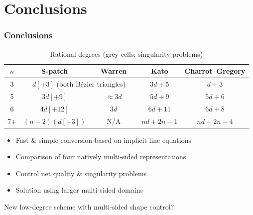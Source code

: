 \documentclass[xcolor=table]{beamer}
\begin{document}
\section {Conclusions}

\begin{frame}
  \frametitle{Conclusions}
  \begin{table}
    \centering
    \small
    \begin{tabular}{c|c|c|c|c}
      $n$ & S-patch & Warren & Kato & Charrot--Gregory \\ \hline
      3 & \multicolumn{2}{c|}{$d[+3]$ (both B\'ezier triangles)} & \cellcolor{light-gray}$3d+5$ & $d+3$ \\ \hline
      5 & \cellcolor{light-light-gray}$3d[+9]$ & $\approx 3d$ & \cellcolor{light-gray}$5d+9$ & $5d+6$ \\ \hline
      6 & \cellcolor{light-light-gray}$4d[+12]$ & $3d$ & \cellcolor{light-gray}$6d+11$ & $6d+8$ \\ \hline
      7+ & \cellcolor{light-gray}$(n-2)(d[+3])$ & $\qquad$N/A$\qquad$ & \cellcolor{light-gray}$nd+2n-1$ & \cellcolor{light-gray}$nd+2n-4$ \\ \hline
    \end{tabular}
    \caption{Rational degrees (grey cells: singularity problems)}
  \end{table}
  \vfill
  \begin{itemize}
  \item Fast \& simple conversion based on implicit line equations
  \item Comparison of four natively multi-sided representations
  \item Control net quality \& singularity problems
  \item Solution using larger multi-sided domains
  \end{itemize}
  \vfill
  \centering
  New low-degree scheme with multi-sided shape control?
\end{frame}
\end{document}
